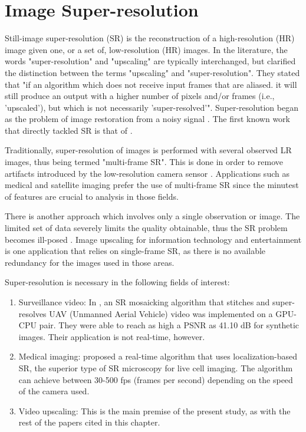 \section{Image Super-resolution}

Still-image super-resolution (SR) is the reconstruction of a high-resolution (HR) image given one, or a set of, low-resolution (HR) images. 
In the literature, the words "super-resolution" and "upscaling" are typically interchanged, but \cite{Takeda2009} clarified the distinction between the terms "upscaling" and "super-resolution". 
They stated that "if an algorithm which does not receive input frames that are aliased. it will still produce an output with a higher number of pixels and/or frames (i.e., 'upscaled'), but which is not necessarily 'super-resolved'".
Super-resolution began as the problem of image restoration from a noisy signal \citep{Helstrom1967}.
The first known work that directly tackled SR is that of \cite{tsai1984multiframe}. 

Traditionally, super-resolution of images is performed with several observed LR images, thus being termed "multi-frame SR". 
This is done in order to remove artifacts introduced by the low-resolution camera sensor \citep{Yang2010a}. 
Applications such as medical and satellite imaging prefer the use of multi-frame SR since the minutest of features are crucial to analysis in those fields.

There is another approach which involves only a single observation or image.
The limited set of data severely limits the quality obtainable, thus 
the SR problem becomes ill-posed \citep{Yang2010a}.
Image upscaling for information technology and entertainment is one application that relies on single-frame SR, as there is no available redundancy for the images used in those areas.

Super-resolution is necessary in the following fields of interest:
\begin{enumerate}
	\item Surveillance video: In \cite{Camargo2010}, an SR mosaicking algorithm that stitches and super-resolves UAV (Unmanned Aerial Vehicle) video was implemented on a GPU-CPU pair. They were able to reach as high a PSNR as 41.10 dB for synthetic images. Their application is not real-time, however.
	\item Medical imaging: 
	\cite{Quan2010} proposed a real-time algorithm that uses localization-based SR, the superior type of SR microscopy for live cell imaging. The algorithm can achieve between 30-500 fps (frames per second) depending on the speed of the camera used.
	\item Video upscaling: This is the main premise of the present study, as with the rest of the papers cited in this chapter.
\end{enumerate}

